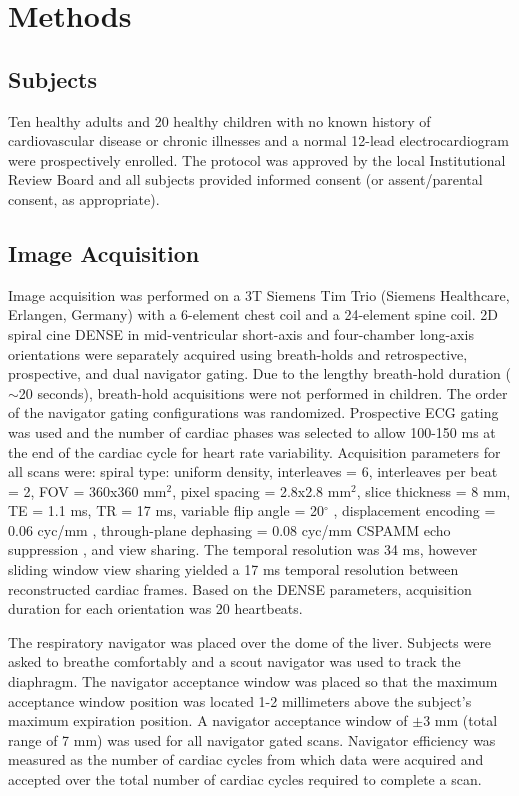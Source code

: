 \section{Methods}

\subsection{Subjects}
	Ten healthy adults and 20 healthy children with no known history of cardiovascular disease or chronic illnesses and a normal 12-lead electrocardiogram were prospectively enrolled. The protocol was approved by the local Institutional Review Board and all subjects provided informed consent (or assent/parental consent, as appropriate).

\subsection{Image Acquisition}
	Image acquisition was performed on a 3T Siemens Tim Trio (Siemens Healthcare, Erlangen, Germany) with a 6-element chest coil and a 24-element spine coil. 2D spiral cine DENSE \cite{Zhong2010a,Wehner2015} in mid-ventricular short-axis and four-chamber long-axis orientations were separately acquired using breath-holds and retrospective, prospective, and dual navigator gating. Due to the lengthy breath-hold duration ($\sim$20 seconds), breath-hold acquisitions were not performed in children. The order of the navigator gating configurations was randomized. Prospective ECG gating was used and the number of cardiac phases was selected to allow 100-150 ms at the end of the cardiac cycle for heart rate variability. Acquisition parameters for all scans were: spiral type: uniform density, interleaves = 6, interleaves per beat = 2, FOV = 360x360 mm$^2$, pixel spacing = 2.8x2.8 mm$^2$, slice thickness = 8 mm, TE = 1.1 ms, TR = 17 ms, variable flip angle = 20$^{\circ}$ \cite{Wehner2015,Stuber1999}, displacement encoding = 0.06 cyc/mm \cite{Wehner2015a}, through-plane dephasing = 0.08 cyc/mm \cite{Zhong2006a} CSPAMM echo suppression \cite{Kim2004}, and view sharing. The temporal resolution was 34 ms, however sliding window view sharing yielded a 17 ms temporal resolution between reconstructed cardiac frames. Based on the DENSE parameters, acquisition duration for each orientation was 20 heartbeats.
	
	The respiratory navigator was placed over the dome of the liver. Subjects were asked to breathe comfortably and a scout navigator was used to track the diaphragm. The navigator acceptance window was placed so that the maximum acceptance window position was located 1-2 millimeters above the subject's maximum expiration position. A navigator acceptance window of $\pm$3 mm (total range of 7 mm) was used for all navigator gated scans. Navigator efficiency was measured as the number of cardiac cycles from which data were acquired and accepted over the total number of cardiac cycles required to complete a scan.

